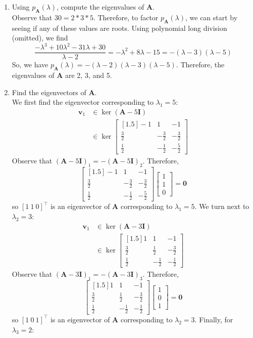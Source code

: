 \documentclass{article}
\begin{document}
\begin{enumerate}
\item Using $p_{\mathbf{A}}(\lambda)$, compute the eigenvalues of $\mathbf{A}$. \\
{\color{blue} Observe that $30 = 2 * 3 * 5$. Therefore, to factor $p_{\mathbf{A}}(\lambda)$, we can start by seeing if any of these values are roots. Using polynomial long division (omitted), we find $$\frac{-\lambda^3 + 10\lambda^2 - 31\lambda + 30}{\lambda - 2} = -\lambda^2 + 8\lambda - 15 = -(\lambda - 3)(\lambda - 5)$$ So, we have $p_{\mathbf{A}}(\lambda) = -(\lambda - 2)(\lambda - 3)(\lambda - 5)$. Therefore, the eigenvalues of $\mathbf{A}$ are 2, 3, and 5.}
\item Find the eigenvectors of $\mathbf{A}$. \\
{\color{blue} We first find the eigenvector corresponding to $\lambda_1 = 5$: \begin{align*}
\mathbf{v}_1 &\in \ker(\mathbf{A} - 5\mathbf{I}) \\
&\in \ker\begin{bmatrix}[1.5] -1 & 1 & -1 \\ \frac{3}{2} & -\frac{3}{2} & -\frac{3}{2} \\ \frac{1}{2} & -\frac{1}{2} & -\frac{5}{2}\end{bmatrix}
\end{align*} Observe that $(\mathbf{A} - 5\mathbf{I})_1 = -(\mathbf{A} - 5\mathbf{I})_2$. Therefore, $$\begin{bmatrix}[1.5] -1 & 1 & -1 \\ \frac{3}{2} & -\frac{3}{2} & -\frac{3}{2} \\ \frac{1}{2} & -\frac{1}{2} & -\frac{5}{2}\end{bmatrix}\begin{bmatrix}1 \\ 1 \\ 0\end{bmatrix} = \mathbf{0}$$ so $[1\ 1\ 0]^{\top}$ is an eigenvector of $\mathbf{A}$ corresponding to $\lambda_1 = 5$. We turn next to $\lambda_2 = 3$:  \begin{align*}
\mathbf{v}_1 &\in \ker(\mathbf{A} - 3\mathbf{I}) \\
&\in \ker\begin{bmatrix}[1.5] 1 & 1 & -1 \\ \frac{3}{2} & \frac{1}{2} & -\frac{3}{2} \\ \frac{1}{2} & -\frac{1}{2} & -\frac{1}{2}\end{bmatrix}
\end{align*} Observe that $(\mathbf{A} - 3\mathbf{I})_1 = -(\mathbf{A} - 3\mathbf{I})_3$. Therefore, $$\begin{bmatrix}[1.5] 1 & 1 & -1 \\ \frac{3}{2} & \frac{1}{2} & -\frac{3}{2} \\ \frac{1}{2} & -\frac{1}{2} & -\frac{1}{2}\end{bmatrix}\begin{bmatrix}1 \\ 0 \\ 1\end{bmatrix} = \mathbf{0}$$ so $[1\ 0\ 1]^{\top}$ is an eigenvector of $\mathbf{A}$ corresponding to $\lambda_2 = 3$. Finally, for $\lambda_3 = 2$:  \begin{align*}

\end{align*}}
\end{enumerate}
\end{document}
